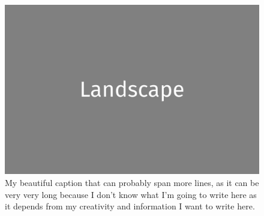 \documentclass[a4paper,twoside]{book}
\newcommand{\blankpage}{\newpage\hbox{}\thispagestyle{empty}\newpage}
\begin{document}
\begin{figure}[H]
	\includegraphics[width=\textwidth]{landscape.png}
	\caption{My beautiful caption that can probably span more lines, as it can be very very long because I don't know what I'm going to write here as it depends from my creativity and information I want to write here.}
\end{figure}

\blankpage


\end{document}
